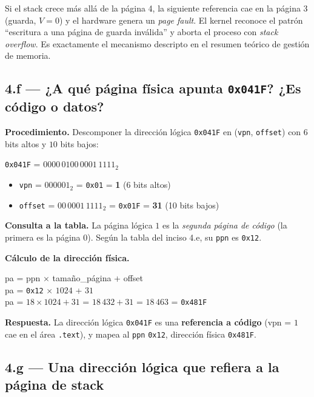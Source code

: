 \documentclass[11pt,a4paper]{article}
\begin{document}
\begin{idea}
Si el stack crece más allá de la página 4, la siguiente referencia cae
en la página 3 (guarda, $V=0$) y el hardware genera un \emph{page
fault}. El kernel reconoce el patrón ``escritura a una página de
guarda inválida'' y aborta el proceso con \emph{stack overflow}. Es
exactamente el mecanismo descripto en el resumen teórico de gestión
de memoria.
\end{idea}

\subsection{4.f --- ¿A qué página física apunta \texttt{0x041F}? ¿Es código o datos?}

\textbf{Procedimiento.} Descomponer la dirección lógica
\texttt{0x041F} en (\texttt{vpn}, \texttt{offset}) con $6$ bits altos
y $10$ bits bajos:

\texttt{0x041F} = $0000\,0100\,0001\,1111_2$

\begin{itemize}[leftmargin=*,nosep]
    \item \texttt{vpn} = $000001_2$ = \texttt{0x01} = \textbf{1}
        (6 bits altos)
    \item \texttt{offset} = $00\,0001\,1111_2$ = \texttt{0x01F} =
        \textbf{31} (10 bits bajos)
\end{itemize}

\textbf{Consulta a la tabla.} La página lógica $1$ es la
\emph{segunda página de código} (la primera es la página $0$). Según
la tabla del inciso 4.e, su \texttt{ppn} es \texttt{0x12}.

\textbf{Cálculo de la dirección física.}

\quad pa = ppn × tamaño\_página + offset \\
\quad pa = \texttt{0x12} × $1024$ + $31$ \\
\quad pa = $18 \times 1024 + 31$ = $18\,432 + 31$ = $18\,463$ = \texttt{0x481F}

\begin{importante}
\textbf{Respuesta.} La dirección lógica \texttt{0x041F} es una
\textbf{referencia a código} (vpn = $1$ cae en el área \texttt{.text}),
y mapea al \texttt{ppn} \texttt{0x12}, dirección física \texttt{0x481F}.
\end{importante}

\subsection{4.g --- Una dirección lógica que refiera a la página de stack}
\end{document}
